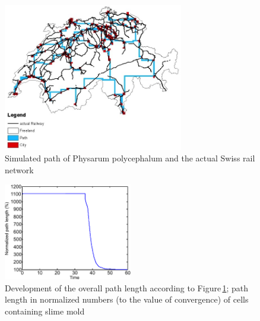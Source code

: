 \documentclass[11pt]{scrartcl}
\begin{document}
\begin{figure}[H]
	\centering
	\includegraphics[width=0.7\textwidth]{figures/path_railway}
	\caption{Simulated path of Physarum polycephalum and the actual Swiss rail network}
	\label{fig:path}
\end{figure}

\begin{figure}[H]
	\centering
	\includegraphics[width=0.5\textwidth]{figures/plottrail1}
	\caption{Development of the overall path length according to Figure\,\ref{fig:path}; path length in normalized numbers (to the value of convergence) of cells containing slime mold}
	\label{fig:plottrail}
\end{figure}
\end{document}
